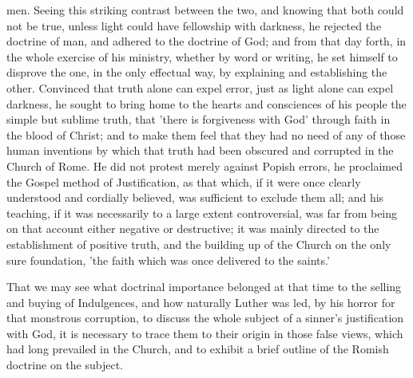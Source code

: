 \documentclass[
]{book}
\begin{document}
men. Seeing this striking contrast between the two, and knowing that both could not be true, unless light could have fellowship with darkness, he rejected the doctrine of man, and adhered to the doctrine of God; and from that day forth, in the whole exercise of his ministry, whether by word or writing, he set himself to disprove the one, in the only effectual way, by explaining and establishing the other. Convinced that truth alone can expel error, just as light alone can expel darkness, he sought to bring home to the hearts and consciences of his people the simple but sublime truth, that 'there is forgiveness with God' through faith in the blood of Christ; and to make them feel that they had no need of any of those human inventions by which that truth had been obscured and corrupted in the Church of Rome. He did not protest merely against Popish errors, he proclaimed the Gospel method of Justification, as that which, if it were once clearly understood and cordially believed, was sufficient to exclude them all; and his teaching, if it was necessarily to a large extent controversial, was far from being on that account either negative or destructive; it was mainly directed to the establishment of positive truth, and the building up of the Church on the only sure foundation, 'the faith which was once delivered to the saints.'

That we may see what doctrinal importance belonged at that time to the selling and buying of Indulgences, and how naturally Luther was led, by his horror for that monstrous corruption, to discuss the whole subject of a sinner's justification with God, it is necessary to trace them to their origin in those false views, which had long prevailed in the Church, and to exhibit a brief outline of the Romish doctrine on the subject.
\end{document}
